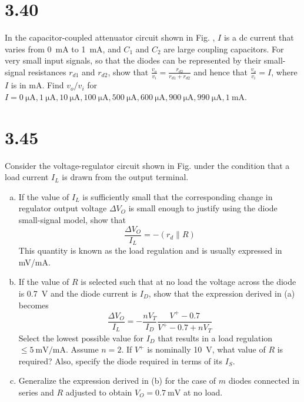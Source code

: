 \documentclass[12pt, a4paper]{article}
\newcommand{\siua}{\micro\ampere}
\newcommand{\sima}{\milli\ampere}
\newcommand{\simv}{\milli\volt}
\newcommand{\siv}{\volt}
\theoremstyle{mystyle}	%
\begin{document}
\section{3.40}
In the capacitor-coupled attenuator circuit shown in Fig. ,
$I$ is a dc current that varies from \SI{0}{\sima} to
\SI{1}{\sima}, and $C_1$ and $C_2$ are large coupling capacitors.
For very small input signals, so that the diodes can be represented by
their small-signal resistances $r_{d1}$ and $r_{d2}$, show that
$\displaystyle \frac{v_o}{v_i} = \frac{r_{d2}}{r_{d1}+r_{d2}}$ and hence
that $\displaystyle \frac{v_o}{v_i}  = I$, where $I$ is in
\si{\sima}. Find $v_o/v_i$ for $I = \SI{0}{\siua}, \SI{1}{\siua},
\SI{10}{\siua}, \SI{100}{\siua}, \SI{500}{\siua}, \SI{600}{\siua},
\SI{900}{\siua}, \SI{990}{\siua}, \SI{1}{\sima}$.

\section{3.45}
Consider the voltage-regulator circuit shown in Fig. under the
condition that a load current $I_L$ is drawn from the output terminal.
\begin{enumerate}[(a)]
  \item If the value of $I_L$ is sufficiently small that the
    corresponding change in regulator output voltage $\Delta V_O$ is
    small enough to justify using the diode small-signal model, show
    that
    \[ \frac{\Delta V_O}{I_L} = -(r_d \parallel R) \]
    This quantity is known as the load regulation and is usually
    expressed in \si{\simv/\sima}.
  \item If the value of $R$ is selected such that at no load the voltage
    across the diode is \SI{0.7}{\siv} and the diode current is $I_D$,
    show that the expression derived in (a) becomes
    \[ \frac{\Delta V_O}{I_L} =
      -\frac{nV_T}{I_D}\frac{V^+ -0.7}{V^+ - 0.7 + nV_T} \]
    Select the lowest possible value for $I_D$ that results in a load
    regulation $\le \SI{5}{\simv/\sima}$. Assume $n = 2$.
    If $V^+$ is nominally \SI{10}{\siv}, what value of $R$ is required?
    Also, specify the diode required in terms of its $I_S$.
  \item Generalize the expression derived in (b) for the case of $m$
    diodes connected in series and $R$ adjusted to obtain $V_O =
    \SI{0.7}{\simv}$ at no load.
\end{enumerate}

\end{document}
